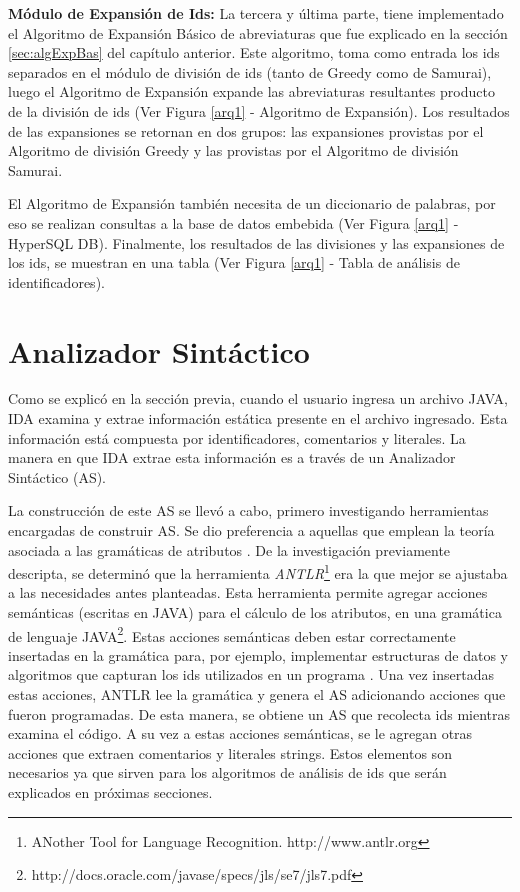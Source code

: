 \textbf{Módulo de Expansión de Ids:} La tercera y última parte, tiene implementado el Algoritmo de Expansión Básico de abreviaturas que fue explicado en la sección \ref{sec:algExpBas} del capítulo anterior.
Este algoritmo, toma como entrada los ids separados en el módulo de división de ids (tanto de Greedy como de Samurai), luego el Algoritmo de Expansión expande las abreviaturas resultantes producto de la división de ids (Ver Figura \ref{arq1} - Algoritmo de Expansión). Los resultados de las expansiones se retornan en dos grupos: las expansiones provistas por el Algoritmo de división Greedy y las provistas por el Algoritmo de división Samurai.


El \mbox{Algoritmo} de Expansión también necesita de un diccionario de palabras, por eso se realizan consultas a la base de datos embebida (Ver Figura \ref{arq1} - HyperSQL DB). Finalmente, los resultados de las divisiones y las expansiones de los ids, se muestran en una tabla (Ver Figura \ref{arq1} - Tabla de análisis de identificadores).

\section{Analizador Sintáctico}

Como se explicó en la sección previa, cuando el usuario ingresa un archivo JAVA, IDA examina y extrae información estática presente en el archivo ingresado. Esta información está compuesta por identificadores, comentarios y literales. La manera en que IDA extrae esta información es a través de un Analizador Sintáctico (AS).

La construcción de este AS se llevó a cabo, primero investigando herramientas encargadas de construir AS. Se dio preferencia a aquellas que emplean la teoría asociada a las gramáticas de atributos \cite{AHUL06}. De la investigación previamente descripta, se determinó que la herramienta \textit{ANTLR}\footnote[1]{ANother Tool for Language Recognition. http://www.antlr.org} era la que mejor se ajustaba a las necesidades antes planteadas. 
Esta herramienta permite agregar acciones semánticas (escritas en JAVA) para el cálculo de los atributos, en una gramática de lenguaje JAVA\footnote[2]{http://docs.oracle.com/javase/specs/jls/se7/jls7.pdf}. Estas acciones semánticas deben estar correctamente insertadas en la gramática para, por ejemplo, implementar estructuras de datos y algoritmos que capturan los ids utilizados en un programa \cite{AAJU83}. Una vez insertadas estas acciones, ANTLR lee la gramática y genera el AS adicionando acciones que fueron programadas. De esta manera, se obtiene un AS que recolecta ids mientras examina el código. A su vez a estas acciones semánticas, se le agregan otras acciones que extraen comentarios y literales strings. Estos elementos son necesarios ya que sirven para los algoritmos de análisis de ids que serán explicados en próximas secciones.

